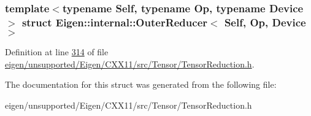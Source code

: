 \subsubsection*{template$<$typename Self, typename Op, typename Device$>$\newline
struct Eigen\+::internal\+::\+Outer\+Reducer$<$ Self, Op, Device $>$}



Definition at line \hyperlink{eigen_2unsupported_2_eigen_2_c_x_x11_2src_2_tensor_2_tensor_reduction_8h_source_l00314}{314} of file \hyperlink{eigen_2unsupported_2_eigen_2_c_x_x11_2src_2_tensor_2_tensor_reduction_8h_source}{eigen/unsupported/\+Eigen/\+C\+X\+X11/src/\+Tensor/\+Tensor\+Reduction.\+h}.



The documentation for this struct was generated from the following file\+:\begin{DoxyCompactItemize}
\item 
eigen/unsupported/\+Eigen/\+C\+X\+X11/src/\+Tensor/\+Tensor\+Reduction.\+h\end{DoxyCompactItemize}
